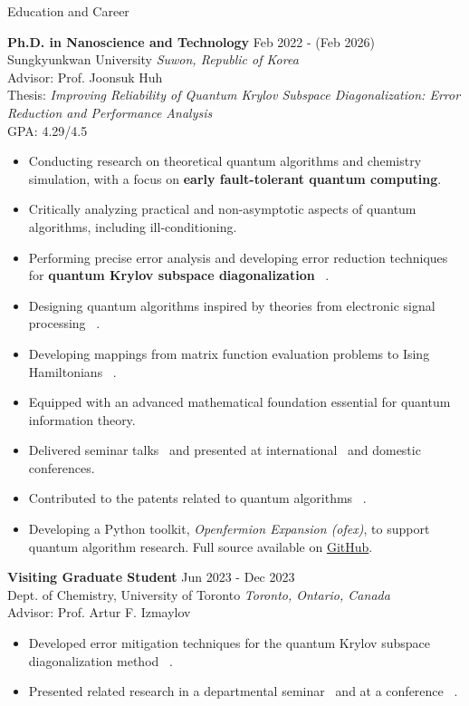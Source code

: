 \documentclass{resume} %
\newcommand*{\AddCiteToCategory}[1]{%
  \AtNextCite{\AtEachCitekey{#1}}}
\newcommand{\citeJour}{\AddCiteToCategory{J}\cite}
\newcommand{\citePrep}{\AddCiteToCategory{JP}\cite}
\newcommand{\citePate}{\AddCiteToCategory{P}\cite}
\newcommand{\citeConf}{\AddCiteToCategory{C}\cite}
\begin{document}
\begin{rSection}{Education and Career}


{\bf Ph.D. in Nanoscience and Technology} \hfill {Feb 2022 - (Feb 2026)}\\
Sungkyunkwan University \hfill \textit{Suwon, Republic of Korea}\\
Advisor: Prof. Joonsuk Huh\\
Thesis: \textit{Improving Reliability of Quantum Krylov Subspace Diagonalization: Error Reduction and Performance Analysis}\\
GPA: 4.29/4.5
\begin{itemize}
    \itemsep -3pt {} 
     \item Conducting research on theoretical quantum algorithms and chemistry simulation, with a focus on \textbf{early fault-tolerant quantum computing}.
     \item Critically analyzing practical and non-asymptotic aspects of quantum algorithms, including ill-conditioning.
     \item Performing precise error analysis and developing error reduction techniques for \textbf{quantum Krylov subspace diagonalization}~\citeJour{Lee2024samplingerror}.
     \item Designing quantum algorithms inspired by theories from electronic signal processing~\citePrep{FilterState2025}.
     \item Developing mappings from matrix function evaluation problems to Ising Hamiltonians~\citePrep{MATFUNC2025}.
     \item Equipped with an advanced mathematical foundation essential for quantum information theory.
     \item Delivered seminar talks~\citeConf{KIAS2024} and presented at international~\citeConf{QTML2024, QTML2022} and domestic~\citeConf{QISK2025, OSK2024, QISK2024, ICQC2022, OPC2022} conferences.
     \item Contributed to the patents related to quantum algorithms~\citePate{hadamard, moment}.
     \item Developing a Python toolkit, \textit{Openfermion Expansion (ofex)}, to support quantum algorithm research. Full source available on \href{https://github.com/snow0369/ofex}{GitHub}.
\end{itemize}

{\bf Visiting Graduate Student} \hfill {Jun 2023 - Dec 2023}\\
Dept. of Chemistry, University of Toronto \hfill \textit{Toronto, Ontario, Canada}\\
Advisor: Prof. Artur F. Izmaylov
\begin{itemize}
   \itemsep -3pt {}
   \item Developed error mitigation techniques for the quantum Krylov subspace diagonalization method~\citeJour{Efficient2025}.
   \item Presented related research in a departmental seminar~\citeConf{QJM2023} and at a conference~\citeConf{SCP2023}.
\end{itemize}


\end{rSection}
\end{document}
